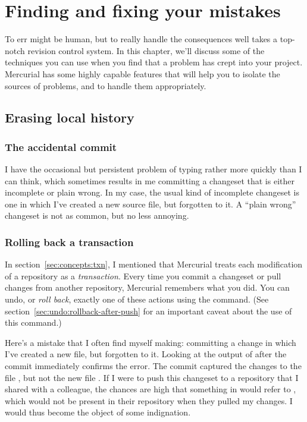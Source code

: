 \chapter{Finding and fixing your mistakes}
\label{chap:undo}

To err might be human, but to really handle the consequences well
takes a top-notch revision control system.  In this chapter, we'll
discuss some of the techniques you can use when you find that a
problem has crept into your project.  Mercurial has some highly
capable features that will help you to isolate the sources of
problems, and to handle them appropriately.

\section{Erasing local history}

\subsection{The accidental commit}

I have the occasional but persistent problem of typing rather more
quickly than I can think, which sometimes results in me committing a
changeset that is either incomplete or plain wrong.  In my case, the
usual kind of incomplete changeset is one in which I've created a new
source file, but forgotten to  it.  A ``plain wrong''
changeset is not as common, but no less annoying.

\subsection{Rolling back a transaction}
\label{sec:undo:rollback}

In section~\ref{sec:concepts:txn}, I mentioned that Mercurial treats
each modification of a repository as a \emph{transaction}.  Every time
you commit a changeset or pull changes from another repository,
Mercurial remembers what you did.  You can undo, or \emph{roll back},
exactly one of these actions using the  command.  (See
section~\ref{sec:undo:rollback-after-push} for an important caveat
about the use of this command.)

Here's a mistake that I often find myself making: committing a change
in which I've created a new file, but forgotten to  it.
Looking at the output of  after the commit immediately
confirms the error.
The commit captured the changes to the file , but not the
new file .  If I were to push this changeset to a
repository that I shared with a colleague, the chances are high that
something in  would refer to , which would not
be present in their repository when they pulled my changes.  I would
thus become the object of some indignation.

